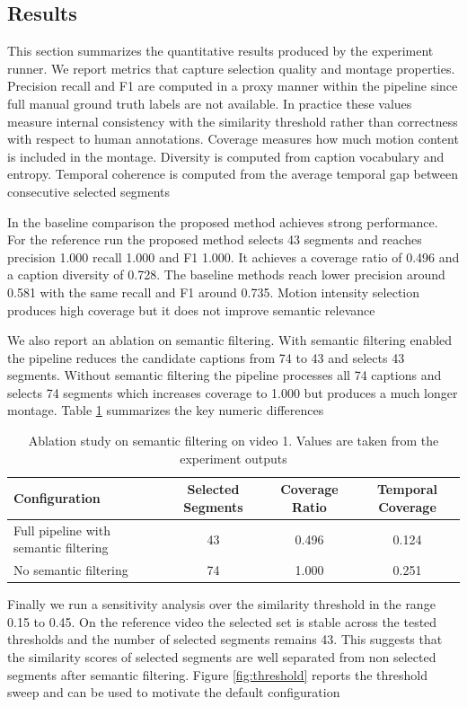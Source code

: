 \documentclass[conference,compsoc]{IEEEtran}
\begin{document}
\subsection{Results}
This section summarizes the quantitative results produced by the experiment runner. We report metrics that capture selection quality and montage properties. Precision recall and F1 are computed in a proxy manner within the pipeline since full manual ground truth labels are not available. In practice these values measure internal consistency with the similarity threshold rather than correctness with respect to human annotations. Coverage measures how much motion content is included in the montage. Diversity is computed from caption vocabulary and entropy. Temporal coherence is computed from the average temporal gap between consecutive selected segments

In the baseline comparison the proposed method achieves strong performance. For the reference run the proposed method selects 43 segments and reaches precision 1.000 recall 1.000 and F1 1.000. It achieves a coverage ratio of 0.496 and a caption diversity of 0.728. The baseline methods reach lower precision around 0.581 with the same recall and F1 around 0.735. Motion intensity selection produces high coverage but it does not improve semantic relevance

We also report an ablation on semantic filtering. With semantic filtering enabled the pipeline reduces the candidate captions from 74 to 43 and selects 43 segments. Without semantic filtering the pipeline processes all 74 captions and selects 74 segments which increases coverage to 1.000 but produces a much longer montage. Table \ref{tab:ablation} summarizes the key numeric differences

\begin{table}[t]
\centering
\caption{Ablation study on semantic filtering on video 1. Values are taken from the experiment outputs}
\label{tab:ablation}
\begin{tabular}{lccc}
\toprule
Configuration & Selected Segments & Coverage Ratio & Temporal Coverage \\
\midrule
Full pipeline with semantic filtering & 43 & 0.496 & 0.124 \\
No semantic filtering & 74 & 1.000 & 0.251 \\
\bottomrule
\end{tabular}
\end{table}

Finally we run a sensitivity analysis over the similarity threshold in the range 0.15 to 0.45. On the reference video the selected set is stable across the tested thresholds and the number of selected segments remains 43. This suggests that the similarity scores of selected segments are well separated from non selected segments after semantic filtering. Figure \ref{fig:threshold} reports the threshold sweep and can be used to motivate the default configuration
\end{document}
